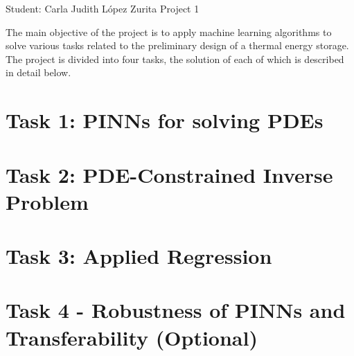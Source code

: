 \documentclass[unicode,11pt,a4paper,oneside,numbers=endperiod,openany]{scrartcl}
\begin{document}
\setassignment
{}

            {Student: Carla Judith L\'opez Zurita}
            {}{Project 1}{}
\newline

The main objective of the project is to apply machine learning algorithms to solve various tasks
related to the preliminary design of a thermal energy storage.
The project is divided into four tasks, the solution of each of which is
described in detail below.

\section{Task 1:  PINNs for solving PDEs}

\section{Task 2: PDE-Constrained Inverse Problem}

\section{Task 3: Applied Regression}

\section{Task 4 - Robustness of PINNs and Transferability (Optional)}
\end{document}
